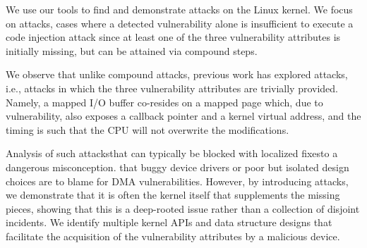 We use our tools to find and demonstrate attacks on the Linux kernel. We focus on \compound attacks, cases where a detected \subpage vulnerability alone is insufficient to execute a code injection attack since at least one of the three vulnerability attributes is initially missing, but can be attained via compound steps. 

We observe that unlike compound attacks, previous work has explored \simple{} attacks, i.e., attacks in which the three vulnerability attributes are trivially provided. 
Namely, a mapped I/O buffer co-resides on a mapped page which, due to \subpage{} vulnerability, also exposes a callback pointer and a kernel virtual address, and the timing is such that the CPU will not overwrite the modifications.

Analysis of such \simple{} attacks\DIFaddbegin \DIFadd{, }\DIFaddend that can typically be blocked with localized fixes\DIFdelbegin {}\DIFdelend \DIFaddbegin {}\DIFaddend to a dangerous misconception. \DIFdelbegin {}\DIFdelend \DIFaddbegin {}\DIFaddend that buggy device drivers or poor but isolated design choices are to blame for DMA vulnerabilities\DIFaddbegin {}\DIFaddend .
However, by introducing \compound attacks, we demonstrate that it is often the kernel itself that supplements the missing pieces, showing that this is a deep-rooted issue rather than a collection of disjoint incidents.
We identify multiple kernel APIs and data structure designs that facilitate the acquisition of the vulnerability attributes by a malicious device.


